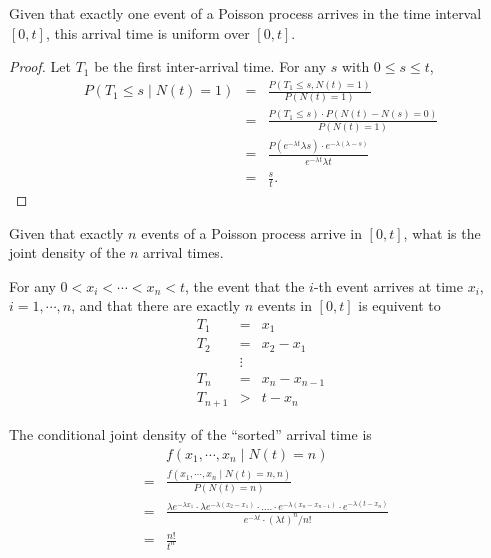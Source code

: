 \begin{properity}
Given that exactly one event of a Poisson process arrives in the time interval $ [0, t] $, this arrival time is uniform over $ [0, t] $.
\begin{proof}
Let $ T_{1} $ be the first inter-arrival time. For any $ s $ with $ 0 \le s \le t $,
\begin{eqnarray*}
P(T_{1} \le s \mid N(t) = 1)
  & = & \frac{P(T_{1} \le s, N(t) = 1)}{P(N(t) = 1)} \\
  & = & \frac{P(T_{1} \le s) \cdot P(N(t) - N(s) = 0)}{P(N(t) = 1)} \\
  & = & \frac{P(e^{-\lambda t} \lambda s) \cdot e^{-\lambda(\lambda - s)}}{e^{-\lambda t} \lambda t} \\
  & = & \frac{s}{t}.
\end{eqnarray*}
\end{proof}
\end{properity}

\begin{corollary}[推廣]
Given that exactly $ n $ events of a Poisson process arrive in $ [0, t] $, what is the joint density of the $ n $ arrival times.

For any $ 0 < x_{i} < \cdots < x_{n} < t $, the event that the $ i $-th event arrives at time $ x_{i} $, $ i = 1, \cdots, n $, and that there are exactly $ n $ events in $ [0, t] $ is equivent to
\begin{eqnarray*}
T_{1} & = & x_{1} \\
T_{2} & = & x_{2} - x_{1} \\
& \vdots & \\
T_{n} & = & x_{n} - x_{n - 1} \\
T_{n + 1} & > & t - x_{n}
\end{eqnarray*}

The conditional joint density of the ``sorted'' arrival time is
\begin{eqnarray*}
  &   & f(x_{1}, \cdots, x_{n} \mid N(t) = n) \\
  & = & \frac{f(x_{1}, \cdots, x_{n} \mid N(t) = n, n)}{P(N(t) = n)} \\
  & = & \frac{\lambda e^{-\lambda x_{1}} \cdot \lambda e^{-\lambda (x_{2} - x_{1})} \cdot .... \cdot e^{-\lambda (x_{n} - x_{n - 1})} \cdot e^{-\lambda (t - x_{n})}}{e^{-\lambda t} \cdot (\lambda t)^{n} / n!} \\
  & = & \frac{n!}{t^{n}}
\end{eqnarray*}
\end{corollary}

